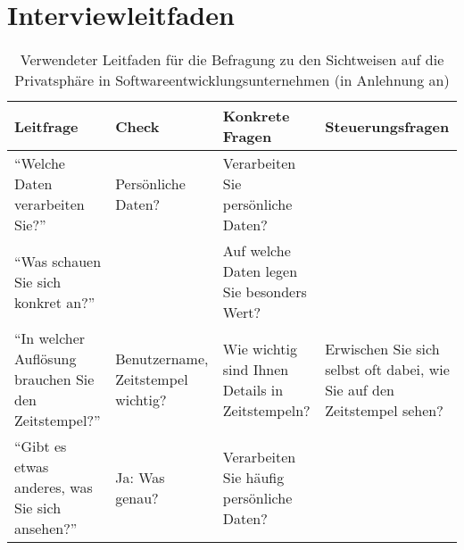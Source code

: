 
\chapter{Interviewleitfaden} \label{interview}

\begin{table*}
    \caption{Verwendeter Leitfaden für die Befragung zu den Sichtweisen auf die Privatsphäre in Softwareentwicklungsunternehmen (in Anlehnung an\cite{Helfferich:2011aa})}
    \label{tab:leitfaden}
    \centering
    \small %
    {\renewcommand{\arraystretch}{1} %
    \begin{tabularx}{\linewidth}{XXXX} %
      \toprule
      Leitfrage & Check & Konkrete Fragen & Steuerungsfragen \\
      \midrule
        \enquote{Welche Daten verarbeiten Sie?}                                                                             & Persönliche Daten?                                                                    & Verarbeiten Sie persönliche Daten?                                                                                            &                                                                                               \\
        \enquote{Was schauen Sie sich konkret an?}                                                                          &                                                                                       & Auf welche Daten legen Sie besonders Wert?                                                                                    &                                                                                               \\
        \enquote{In welcher Auflösung brauchen Sie den Zeitstempel?}                                                        & Benutzername, Zeitstempel wichtig?                                                    & Wie wichtig sind Ihnen Details in Zeitstempeln?                                                                               & Erwischen Sie sich selbst oft dabei, wie Sie auf den Zeitstempel sehen?                       \\
        \enquote{Gibt es etwas anderes, was Sie sich ansehen?}                                                              & Ja: Was genau?                                                                        & Verarbeiten Sie häufig persönliche Daten?                                                                                     &                                                                                               \\

\end{tabularx}}
\end{table*}
